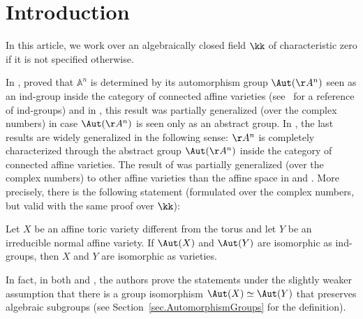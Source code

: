 \section{Introduction}

In this article, we work over an algebraically closed field $\kk$ of characteristic zero
if it is not specified
otherwise.

In \cite[Th.\,1.1]{Kraft2017},  proved
that $\mathbb{A}^n$ is determined by
its automorphism group $\Aut(\AA^n)$ seen as an ind-group
inside the category of connected affine varieties
(see~\cite{FuKr2018On-the-geometry-of} for a reference of ind-groups) and in \cite[Main Th.]{KrReSa2018Is-the-affine-spac},
this result was partially generalized (over the complex numbers)
in case $\Aut(\AA^n)$ is seen only as an abstract group.
In \cite[Th.\,A]{CaReXi2019Families-of-Commut},
the last results are widely generalized in the following sense:
$\AA^n$ is completely characterized through the abstract group
$\Aut(\AA^n)$ inside the category of connected affine varieties.
The result of  was partially generalized (over the complex numbers) to other affine varieties
than the affine space in \cite{Re2017Characterization-o} and \cite{LiReUr2018Characterization-o}.
More precisely, there is the following statement
(formulated over the complex numbers, but valid with the same proof over $\kk$):

\begin{introtheorem}
\label{theorem0}
Let $X$ be an affine toric variety different from the torus
and let $Y$ be an irreducible normal affine variety. If $\Aut(X)$ and $\Aut(Y)$ are isomorphic
as ind-groups, then $X$ and $Y$ are isomorphic as varieties.
\end{introtheorem}

\begin{introremark}
\label{rem.Theorem0}
In fact, in both \cite{Kraft2017} and \cite[Th.\,1.4]{LiReUr2018Characterization-o}, the
authors prove the statements under the slightly weaker assumption
that there is a group isomorphism $\Aut(X) \simeq \Aut(Y)$
that preserves algebraic subgroups (see Section~\ref{sec.AutomorphismGroups} for the definition).
\end{introremark}


